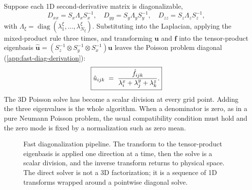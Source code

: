 \documentclass[11pt]{article}
\newcommand{\kron}{\otimes}
\newcommand{\Dxx}{D_{xx}}
\newcommand{\Dyy}{D_{yy}}
\newcommand{\Dzz}{D_{zz}}
\newcommand{\diag}{\operatorname{diag}}
\begin{document}
Suppose each 1D second-derivative matrix is diagonalizable,
\begin{equation}
  \Dxx = S_x \Lambda_x S_x^{-1},
  \quad
  \Dyy = S_y \Lambda_y S_y^{-1},
  \quad
  \Dzz = S_z \Lambda_z S_z^{-1},
\end{equation}
with $\Lambda_\xi = \diag(\lambda_1^\xi, \ldots, \lambda_{N_\xi}^\xi)$.
Substituting into the Laplacian, applying the mixed-product rule
three times, and transforming $\bm{u}$ and $\bm{f}$ into the
tensor-product eigenbasis
$\hat{\bm{u}} = (S_z^{-1} \kron S_y^{-1} \kron S_x^{-1})\bm{u}$
leaves the Poisson problem diagonal
(\cref{app:fast-diag-derivation}):
\begin{equation}
\label{eq:poisson-diag}
  \boxed{%
    \hat{u}_{ijk}
    \;=\;
    \frac{\hat{f}_{ijk}}{\lambda_i^x + \lambda_j^y + \lambda_k^z}.
  }
\end{equation}
The 3D Poisson solve has become a scalar division at every grid
point.  Adding the three eigenvalues is the whole algorithm.  When a
denominator is zero, as in a pure Neumann Poisson problem, the usual
compatibility condition must hold and the zero mode is fixed by a
normalization such as zero mean.

\begin{figure}[t]
  \centering
  \caption{Fast diagonalization pipeline.  The transform to the tensor-product
  eigenbasis is applied one direction at a time, then the solve is a
  scalar division, and the inverse transform returns to physical space.
  The direct solver is not a 3D factorization; it is a sequence of 1D
  transforms wrapped around a pointwise diagonal solve.}
  \label{fig:fastdiag-pipeline}
\end{figure}
\end{document}
